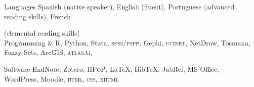 





\begin{cvskills}

\cvskill
{Languages} 
{Spanish (native speaker), English (fluent), Portuguese (advanced reading skills), French} 

\cvskill
{} 
{(elemental reading skills)} \\

\cvskill
{Programming \&} 
{R, Python, Stata, {\scshape spss/pspp}, Gephi, {\scshape ucinet}, NetDraw, Tosmana, Fuzzy-Sets, ArcGIS, {\scshape atlas}.ti,}

\cvskill
{Software} 
{EndNote, Zotero, {\scshape HPoP}, {\LaTeX}, Bib{\TeX}, JabRef, MS Office, WordPress, Moodle, {\scshape html}, {\scshape css}, {\scshape xhtml}} \\

\end{cvskills}
